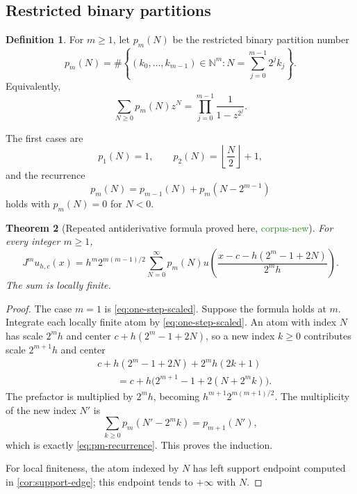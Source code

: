 \documentclass[11pt]{article}
\newtheorem{theorem}{Theorem}[section]
\theoremstyle{definition}
\newtheorem{definition}[theorem]{Definition}
\theoremstyle{remark}
\newcommand{\N}{\mathbb{N}}
\newcommand{\1}{\mathbf{1}}
\newcommand{\CorpusNew}{\textcolor{ForestGreen}{\textsf{corpus-new}}}
\newcommand{\ProvedHere}{\textcolor{BrickRed}{\textsf{proved here}}}
\begin{document}
\subsection{Restricted binary partitions}

\begin{definition}
For $m\geq1$, let $p_m(N)$ be the restricted binary partition number
\begin{equation}
 p_m(N)=\#\left\{(k_0,\ldots,k_{m-1})\in\N^m:
 N=\sum_{j=0}^{m-1}2^jk_j\right\}.
 \label{eq:pm-def}
\end{equation}
Equivalently,
\begin{equation}
 \sum_{N\geq0}p_m(N)z^N
 =\prod_{j=0}^{m-1}\frac{1}{1-z^{2^j}}.
 \label{eq:pm-gf}
\end{equation}
\end{definition}

The first cases are
\[
 p_1(N)=1,
 \qquad
 p_2(N)=\left\lfloor\frac N2\right\rfloor+1,
\]
and the recurrence
\begin{equation}
 p_m(N)=p_{m-1}(N)+p_m(N-2^{m-1})
 \label{eq:pm-recurrence}
\end{equation}
holds with $p_m(N)=0$ for $N<0$.

\begin{theorem}[Repeated antiderivative formula \ProvedHere, \CorpusNew]
\label{thm:iterated-J}
For every integer $m\geq1$,
\begin{equation}
 J^m u_{h,c}(x)
 =h^m2^{m(m-1)/2}
 \sum_{N=0}^{\infty}p_m(N)
 u\!\left(
 \frac{x-c-h(2^m-1+2N)}{2^mh}
 \right).
 \label{eq:iterated-J}
\end{equation}
The sum is locally finite.
\end{theorem}

\begin{proof}
The case $m=1$ is \eqref{eq:one-step-scaled}.  Suppose the formula holds at
$m$.  Integrate each locally finite atom by \eqref{eq:one-step-scaled}.  An
atom with index $N$ has scale $2^mh$ and center
$c+h(2^m-1+2N)$, so a new index $k\geq0$ contributes scale $2^{m+1}h$ and
center
\begin{align*}
 &c+h(2^m-1+2N)+2^mh(2k+1)\\
 &\qquad=c+h\bigl(2^{m+1}-1+2(N+2^mk)\bigr).
\end{align*}
The prefactor is multiplied by $2^mh$, becoming
$h^{m+1}2^{m(m+1)/2}$.  The multiplicity of the new index $N'$ is
\[
 \sum_{k\geq0}p_m(N'-2^mk)=p_{m+1}(N'),
\]
which is exactly \eqref{eq:pm-recurrence}.  This proves the induction.

For local finiteness, the atom indexed by $N$ has left support endpoint
computed in \cref{cor:support-edge}; this endpoint tends to $+\infty$ with
$N$.
\end{proof}
\end{document}
